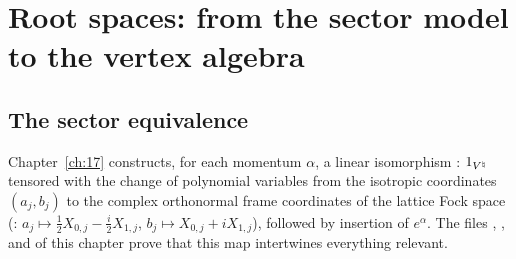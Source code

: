 \section{Root spaces: from the sector model to the vertex algebra}\label{ch18:sec:roots}

\subsection{The sector equivalence}

Chapter~\ref{ch:17} constructs, for each momentum $\alpha$, a linear isomorphism
: $1_{{V^{\natural}}}$ tensored
with the change of polynomial variables from the isotropic coordinates $(a_j,b_j)$ to the complex orthonormal
frame coordinates of the lattice Fock space (: $a_j\mapsto\frac12X_{0,j}-\frac
i2X_{1,j}$, $b_j\mapsto X_{0,j}+iX_{1,j}$), followed by insertion of $e^\alpha$.  The files
, ,  and
 of this chapter prove that this map intertwines everything relevant.

